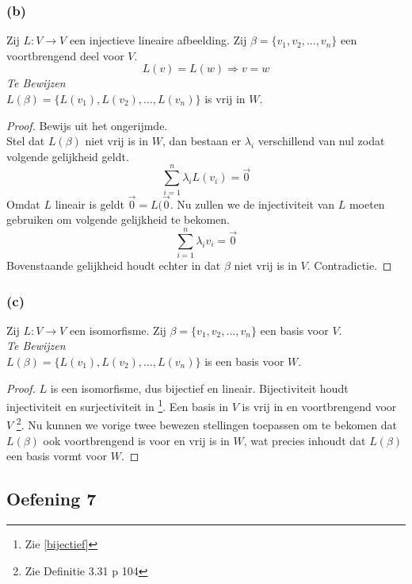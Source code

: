 \documentclass[lineaire_algebra_oplossingen.tex]{subfiles}
\begin{document}
\subsubsection*{(b)}
Zij $L: V \rightarrow V$ een injectieve lineaire afbeelding. Zij $\beta = \{v_1,v_2,...,v_n\}$ een voortbrengend deel voor $V$.
\[
L(v) = L(w) \Rightarrow v = w
\]
\emph{Te Bewijzen}\\
$L(\beta) = \{L(v_1),L(v_2),...,L(v_n)\}$ is vrij in $W$.
\begin{proof}
Bewijs uit het ongerijmde.\\
Stel dat $L(\beta)$ niet vrij is in $W$, dan bestaan er $\lambda_i$ verschillend van nul zodat volgende gelijkheid geldt.
\[
\sum_{i=1}^n \lambda_i L(v_i) = \vec{0}
\]
Omdat $L$ lineair is geldt $\vec{0} = L(\vec{0}$. Nu zullen we de injectiviteit van $L$ moeten gebruiken om volgende gelijkheid te bekomen.
\[
\sum_{i=1}^n \lambda_i v_i = \vec{0}
\]
Bovenstaande gelijkheid houdt echter in dat $\beta$ niet vrij is in $V$. Contradictie.
\end{proof}

\subsubsection*{(c)}
Zij $L: V \rightarrow V$ een isomorfisme. Zij $\beta = \{v_1,v_2,...,v_n\}$ een basis voor $V$.\\
\emph{Te Bewijzen}\\
$L(\beta) = \{L(v_1),L(v_2),...,L(v_n)\}$ is een basis voor $W$.
\begin{proof}
$L$ is een isomorfisme, dus bijectief en lineair. Bijectiviteit houdt injectiviteit en surjectiviteit in \footnote{Zie \ref{bijectief}}. Een basis in $V$ is vrij in en voortbrengend voor $V$ \footnote{Zie Definitie 3.31 p 104}. Nu kunnen we vorige twee bewezen stellingen toepassen om te bekomen dat $L(\beta)$ ook voortbrengend is voor en vrij is in $W$, wat precies inhoudt dat $L(\beta)$ een basis vormt voor $W$.
\end{proof}

\subsection{Oefening 7}
\end{document}
